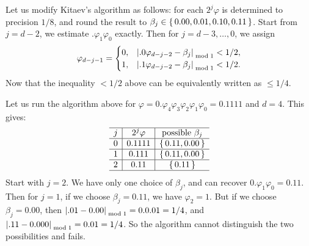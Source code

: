 \begin{exam}
Let us modify Kitaev's algorithm as follows: for each $2^j \varphi$ is determined to precision $1/8$, and round the result to $\beta_j\in\set{0.00,0.01,0.10,0.11}$. Start from $j=d-2$, we estimate $.\varphi_1\varphi_0$ exactly. Then for $j=d-3,\ldots,0$, we assign
\begin{equation}\label{eqn:kitaev_decidephi_2}
\varphi_{d-j-1}=\begin{cases}
0,& \left\lvert.0\varphi_{d-j-2}-\beta_j\right\rvert_{\bmod 1}<1/2,\\
1,& \left\lvert.1\varphi_{d-j-2}-\beta_j\right\rvert_{\bmod 1}<1/2.
\end{cases}
\end{equation}
Now that the inequality $<1/2$ above can be equivalently written as $\le 1/4$.
  
Let us run the algorithm above for $\varphi=0.\varphi_4\varphi_3\varphi_2\varphi_1\varphi_0=0.1111$ and $d=4$. This gives:
\[
\begin{array}{c|c|c}\hline
j & 2^j \varphi & \mbox{possible }\beta_j \\\hline
0 & 0.1111 & \set{0.11,0.00} \\\hline
1 & 0.111 & \set{0.11,0.00} \\\hline
2 & 0.11 & \set{0.11} \\\hline
\end{array}
\]
Start with $j=2$. We have only one choice of $\beta_j$, and can recover $0.\varphi_1\varphi_0=0.11$. Then for $j=1$, if we choose $\beta_j=0.11$, we have $\varphi_2=1$. But if we choose $\beta_j=0.00$, then 
$\left\lvert.01-0.00\right\rvert_{\bmod 1}=0.0.01=1/4$, and $\left\lvert.11-0.000\right\rvert_{\bmod 1}=0.01=1/4$. So the algorithm cannot distinguish the two possibilities and fails.
\end{exam}

